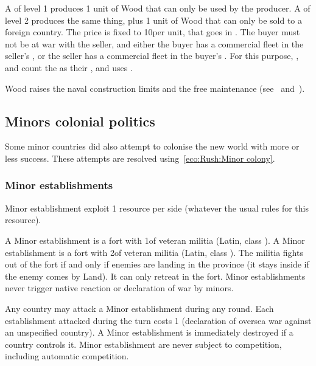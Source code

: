  A  \MNU of level 1 produces 1 unit of Wood
that can only be used by the producer. A  \MNU of level 2 produces
the same thing, plus 1 unit of Wood that can only be sold to a foreign
country.
\bparag The price is fixed to 10\ducats per unit, that goes in
.
\bparag The buyer must not be at war with the seller, and either the buyer has
a commercial fleet in the seller's \CTZ, or the seller has a commercial fleet
in the buyer's \CTZ.
\bparag For this purpose, \PRU, \POL and \SUE count the  as
their \CTZ, and \POR uses .

 Wood raises the naval construction limits and the free
maintenance (see~
and~).



\subsection{Minors colonial politics}

\aparag Some minor countries did also attempt to colonise the new world with
more or less success.
\bparag These attempts are resolved using~\ref{eco:Rush:Minor colony}.


\subsubsection{Minor establishments}
\aparag[Effects] Minor establishment exploit 1 resource per side (whatever the
usual rules for this resource).

\aparag[Military] A Minor establishment \Facemoins is a fort with 1\LDE of
veteran militia (Latin, class \CAIII).
\bparag A Minor establishment \Faceplus is a fort with 2\LDE of veteran
militia (Latin, class \CAIII).
\bparag The militia fights out of the fort if and only if enemies are landing
in the province (it stays inside if the enemy comes by Land). It can only
retreat in the fort.
\bparag Minor establishments never trigger native reaction or declaration of
war by \ROTW minors.

\aparag[Destruction] Any country may attack a Minor establishment during any
round.
\bparag Each establishment attacked during the turn costs 1 \STAB (declaration
of oversea war against an unspecified country).
\bparag A Minor establishment is immediately destroyed if a country controls
it.
\bparag Minor establishment are never subject to competition, including
automatic competition.


